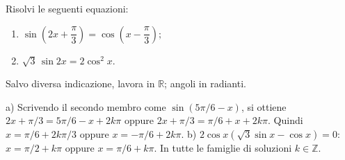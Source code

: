 
\begin{esercizio}
Risolvi le seguenti equazioni: 

\begin{enumerate}
\item $\displaystyle
\sin\left(2x+\dfrac{\pi}{3}\right)
=\cos\left(x-\dfrac{\pi}{3}\right);$

\item $\displaystyle
\sqrt{3}\,\sin 2x=2\cos^2x.$
\end{enumerate}
Salvo diversa indicazione, lavora in $\mathbb R$; angoli in radianti.
\end{esercizio}

\begin{soluzione}
a) Scrivendo il secondo membro come $\sin(5\pi/6-x)$, si ottiene
$2x+\pi/3=5\pi/6-x+2k\pi$ oppure $2x+\pi/3=\pi/6+x+2k\pi$.
Quindi $x=\pi/6+2k\pi/3$ oppure $x=-\pi/6+2k\pi$.
b) $2\cos x(\sqrt3\sin x-\cos x)=0$:
$x=\pi/2+k\pi$ oppure $x=\pi/6+k\pi$. In tutte le famiglie di soluzioni $k\in\mathbb{Z}$.
\end{soluzione}
